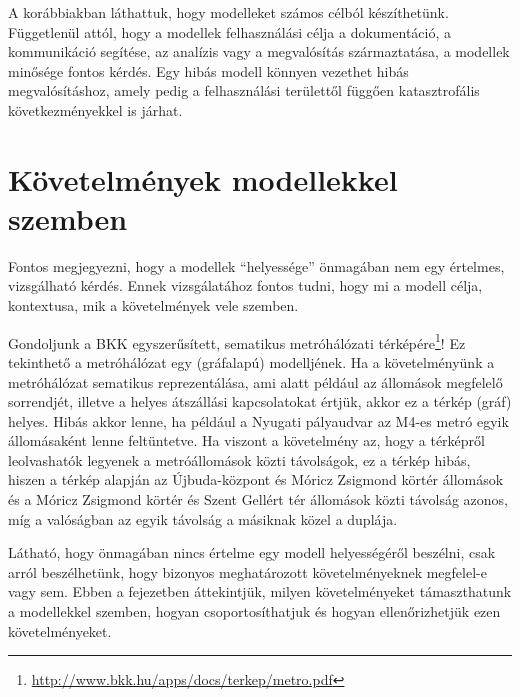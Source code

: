 \label{sec:modellek-ellenorzese}

\newcommand{\kiegeszitoanyag}{\textsuperscript{($\ast$)}}
\newcommand{\modellekEllenorzeseAllapotgepScale}{0.5}

A korábbiakban láthattuk, hogy modelleket számos célból készíthetünk. Függetlenül attól, hogy a modellek felhasználási célja a dokumentáció, a kommunikáció segítése, az analízis vagy a megvalósítás származtatása, a modellek minősége fontos kérdés. Egy hibás modell könnyen vezethet hibás megvalósításhoz, amely pedig a felhasználási területtől függően katasztrofális következményekkel is járhat.



\section{Követelmények modellekkel szemben}

Fontos megjegyezni, hogy a modellek ``helyessége'' önmagában nem egy értelmes, vizsgálható kérdés. Ennek vizsgálatához fontos tudni, hogy mi a modell célja, kontextusa, mik a követelmények vele szemben.

\begin{megjegyzes}
	Gondoljunk a BKK egyszerűsített, sematikus metróhálózati térképére\footnote{\url{http://www.bkk.hu/apps/docs/terkep/metro.pdf}}! Ez tekinthető a metróhálózat egy (gráfalapú) modelljének. Ha a követelményünk a metróhálózat sematikus reprezentálása, ami alatt például az állomások megfelelő sorrendjét, illetve a helyes átszállási kapcsolatokat értjük, akkor ez a térkép (gráf) helyes. Hibás akkor lenne, ha például a Nyugati pályaudvar az M4-es metró egyik állomásaként lenne feltüntetve. Ha viszont a követelmény az, hogy a térképről leolvashatók legyenek a metróállomások közti távolságok, ez a térkép hibás, hiszen a térkép alapján az Újbuda-központ és Móricz Zsigmond körtér állomások és a Móricz Zsigmond körtér és Szent Gellért tér állomások közti távolság azonos, míg a valóságban az egyik távolság a másiknak közel a duplája. 
\end{megjegyzes}

Látható, hogy önmagában nincs értelme egy modell helyességéről beszélni, csak arról beszélhetünk, hogy bizonyos meghatározott követelményeknek megfelel-e vagy sem.
Ebben a fejezetben áttekintjük, milyen követelményeket támaszthatunk a modellekkel szemben, hogyan csoportosíthatjuk és hogyan ellenőrizhetjük ezen követelményeket.

